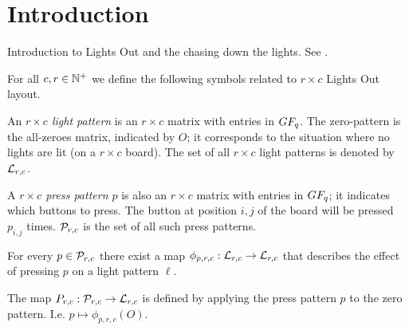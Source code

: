 \section{Introduction}

Introduction to Lights Out and the chasing down the lights. See \cite{martin01}.

\begin{definition}
  For all $c,r\in\mathbb{N}^{+}$ we define the following symbols related to
  $r \times c$ Lights Out layout.

  An {\it $r\times c$ light pattern} is an $r\times c$ matrix
  with entries in $GF_q$. The zero-pattern is the all-zeroes
  matrix, indicated by $O$; it corresponds to the situation
  where no lights are lit (on a $r\times c$ board).
  The set of all $r\times c$ light patterns is denoted by $\mathcal{L}_{r,c}$.

  A {\it $r\times c$ press pattern $p$} is also an $r\times c$ matrix
  with entries in $GF_q$; it indicates which buttons to press. The
  button at position $i, j$ of the board will be pressed $p_{i,j}$
  times. $\mathcal{P}_{r,c}$ is the set of all such press patterns.

  For every $p\in\mathcal{P}_{r,c}$ there exist a map $\phi_{p,r,c} : \mathcal{L}_{r,c}
  \rightarrow \mathcal{L}_{r,c}$ that describes the effect of pressing $p$ on
  a light pattern $\ell$.

  The map $P_{r,c} : \mathcal{P}_{r,c} \rightarrow \mathcal{L}_{r,c}$ is defined by
  applying the press pattern $p$ to the zero pattern. I.e.
  $p \mapsto \phi_{p,r,c}(O)$.
\end{definition}
